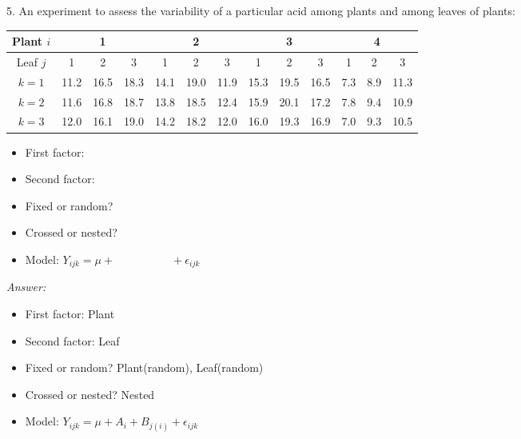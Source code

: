 5. An experiment to assess the variability of a particular acid among plants and among leaves of plants:
\begin{table}[H]
	\renewcommand{\arraystretch}{1.5}
	\centering
	\begin{tabular}{c|ccc|ccc|ccc|ccc}
		Plant $i$ & \multicolumn{3}{c}{1} & \multicolumn{3}{c}{2} & \multicolumn{3}{c}{3} &\multicolumn{3}{c}{4}\\
		\hline
		Leaf $j$ & 1& 2 & 3 &1& 2 & 3 &1& 2 & 3 &1& 2 & 3 \\
		\hline
		$k = 1$ & 11.2 & 16.5& 18.3& 14.1 &  19.0 & 11.9& 15.3& 19.5& 16.5& 7.3& 8.9& 11.3\\
		$k = 2$ & 11.6 & 16.8& 18.7& 13.8 &  18.5 & 12.4& 15.9& 20.1& 17.2& 7.8& 9.4& 10.9\\		
		$k = 3$ & 12.0 & 16.1& 19.0& 14.2 &  18.2 & 12.0& 16.0& 19.3& 16.9& 7.0& 9.3& 10.5\\		
		\bottomrule
	\end{tabular}
\end{table}

\begin{itemize}
	\item First factor:  
	\item Second factor: 
	\item Fixed or random?  
	\item Crossed or nested?
	\item Model:  $Y_{ijk} = \mu  + \quad \quad \quad \quad \quad  + \epsilon_{ijk}$
\end{itemize}

{\it Answer:}\\
\begin{pf}
	\begin{itemize}
		\item First factor:  Plant
		\item Second factor: Leaf
		\item Fixed or random?  Plant(random), Leaf(random)
		\item Crossed or nested?  Nested
		\item Model:   $Y_{ijk} = \mu + A_i + B_{j(i)} + \epsilon_{ijk}$
	\end{itemize}
\end{pf}

